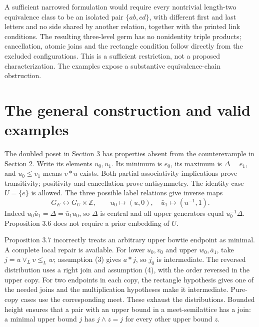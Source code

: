 \documentclass[10pt]{article}
\begin{document}
A sufficient narrowed formulation would require every nontrivial length-two equivalence class to be an isolated pair \(\{ab,cd\}\), with different first and last letters and no side shared by another relation, together with the printed link conditions. The resulting three-level germ has no nonidentity triple products; cancellation, atomic joins and the rectangle condition follow directly from the excluded configurations. This is a sufficient restriction, not a proposed characterization. The examples expose a substantive equivalence-chain obstruction.\par
\section*{The general construction and valid examples}
The doubled poset in Section 3 has properties absent from the counterexample in Section 2. Write its elements \(u_0,\bar u_1\). Its minimum is \(e_0\), its maximum is \(\Delta=\bar e_1\), and \(u_0\le\bar v_1\) means \(v*u\) exists. Both partial-associativity implications prove transitivity; positivity and cancellation prove antisymmetry. The identity case \(U=\{e\}\) is allowed. The three possible label relations give inverse maps \[G_E\longleftrightarrow G_U\times\mathbb Z,\qquad
 u_0\mapsto(u,0),\quad\bar u_1\mapsto(u^{-1},1).\] Indeed \(u_0\bar u_1=\Delta=\bar u_1u_0\), so \(\Delta\) is central and all upper generators equal \(u_0^{-1}\Delta\). Proposition 3.6 does not require a prior embedding of \(U\).\par
Proposition 3.7 incorrectly treats an arbitrary upper bowtie endpoint as minimal. A complete local repair is available. For lower \(u_0,v_0\) and upper \(w_0,\bar a_1\), take \(j=u\vee_Lv\le_Lw\); assumption (3) gives \(a*j\), so \(j_0\) is intermediate. The reversed distribution uses a right join and assumption (4), with the order reversed in the upper copy. For two endpoints in each copy, the rectangle hypothesis gives one of the needed joins and the multiplication hypotheses make it intermediate. Pure-copy cases use the corresponding meet. These exhaust the distributions. Bounded height ensures that a pair with an upper bound in a meet-semilattice has a join: a minimal upper bound \(j\) has \(j\wedge z=j\) for every other upper bound \(z\).\par
\end{document}
